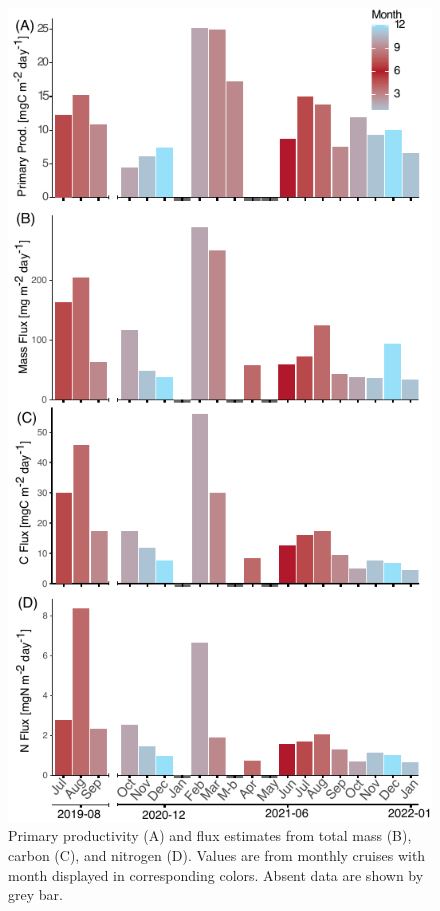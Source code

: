 \documentclass[
]{article}
\begin{document}
\begin{figure}[H]

{\centering \includegraphics{images/03_prod-flux.pdf}

}

\caption{Primary productivity (A) and flux estimates from total mass
(B), carbon (C), and nitrogen (D). Values are from monthly cruises with
month displayed in corresponding colors. Absent data are shown by grey
bar.}

\end{figure}%
\end{document}
